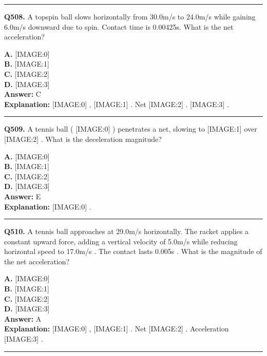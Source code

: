 \documentclass[12pt]{article}
\begin{document}
\hrule
\vspace{1em}


\noindent
\textbf{Q508.} A topspin ball slows horizontally from 30.0m/s
to 24.0m/s
while gaining 6.0m/s
downward due to spin. Contact time is 0.00425s.
What is the net acceleration?



\textbf{A.} [IMAGE:0] \\
\textbf{B.} [IMAGE:1] \\
\textbf{C.} [IMAGE:2] \\
\textbf{D.} [IMAGE:3] \\

\textbf{Answer:} C \\
\textbf{Explanation:} [IMAGE:0]
,
[IMAGE:1]
. Net
[IMAGE:2]
.
[IMAGE:3]
.

\hrule
\vspace{1em}


\noindent
\textbf{Q509.} A tennis ball (
[IMAGE:0]
) penetrates a net, slowing to
[IMAGE:1]
over
[IMAGE:2]
.
What is the deceleration magnitude?



\textbf{A.} [IMAGE:0] \\
\textbf{B.} [IMAGE:1] \\
\textbf{C.} [IMAGE:2] \\
\textbf{D.} [IMAGE:3] \\

\textbf{Answer:} E \\
\textbf{Explanation:} [IMAGE:0]
.

\hrule
\vspace{1em}


\noindent
\textbf{Q510.} A tennis ball approaches at 29.0m/s
horizontally. The racket applies a constant upward force, adding a vertical velocity of 5.0m/s
while reducing horizontal speed to 17.0m/s
. The contact lasts 0.005s
.
What is the magnitude of the net acceleration?



\textbf{A.} [IMAGE:0] \\
\textbf{B.} [IMAGE:1] \\
\textbf{C.} [IMAGE:2] \\
\textbf{D.} [IMAGE:3] \\

\textbf{Answer:} A \\
\textbf{Explanation:} [IMAGE:0]
,
[IMAGE:1]
. Net
[IMAGE:2]
. Acceleration
[IMAGE:3]
.

\hrule
\vspace{1em}
\end{document}
